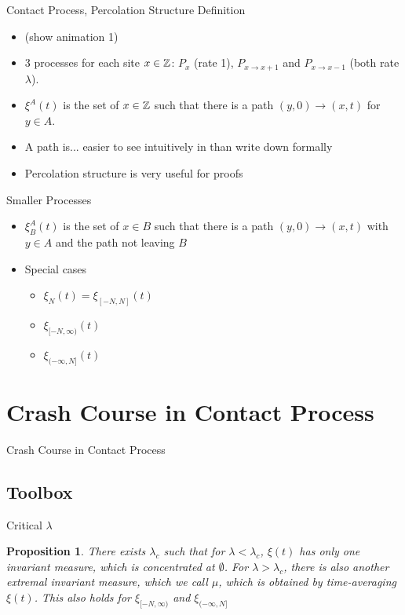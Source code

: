 \documentclass{beamer}
\newtheorem*{proposition}{Proposition}
\newcommand{\ignore}[1]{}
\newcommand{\rb}{\ignore{[}]}
\begin{document}
\begin{frame}{Contact Process, Percolation Structure Definition}
  \begin{itemize}
    \item (show animation 1)
    \pause
    \item 3 processes for each site $x \in \mathbb{Z}$: $P_{x}$ (rate 1), $P_{x \to x+1}$ and $P_{x \to x-1}$ (both rate $\lambda$).
    \pause
    \item $\xi^{A}(t)$ is the set of $x \in \mathbb{Z}$ such that there is a path $(y,0) \to (x,t)$ for $y \in A$.
    \pause
    \item A path is... \pause easier to see intuitively in than write down formally
    \pause
    \item Percolation structure is very useful for proofs
  \end{itemize}
\end{frame}

\begin{frame}{Smaller Processes}
  \begin{itemize}
    \item $\xi_{B}^{A}(t)$ is the set of $x \in B$ such that there is a path $(y,0) \to (x,t)$ with $y \in A$ and the path not leaving $B$
          \pause
    \item Special cases
    \begin{itemize}
      \item $\xi_{N}(t) = \xi_{[-N,N]}(t)$
      \item $\xi_{[-N,\infty)}(t)$
      \item $\xi_{(-\infty,N\rb}(t)$
    \end{itemize}
  \end{itemize}
\end{frame}

\section{Crash Course in Contact Process}

\begin{frame}{Crash Course in Contact Process}
  \tableofcontents[currentsection]
\end{frame}

\subsection{Toolbox}

\begin{frame}{Critical $\lambda$}
  \begin{proposition}
    There exists $\lambda_{c}$ such that for $\lambda < \lambda_{c}$, $\xi(t)$ has only one invariant measure, which is concentrated at $\emptyset$. For $\lambda > \lambda_{c}$, there is also another extremal invariant measure, which we call $\mu$, which is obtained by time-averaging $\xi(t)$. This also holds for $\xi_{[-N,\infty)}$ and $\xi_{(-\infty,N\rb}$
  \end{proposition}
\end{frame}
\end{document}
